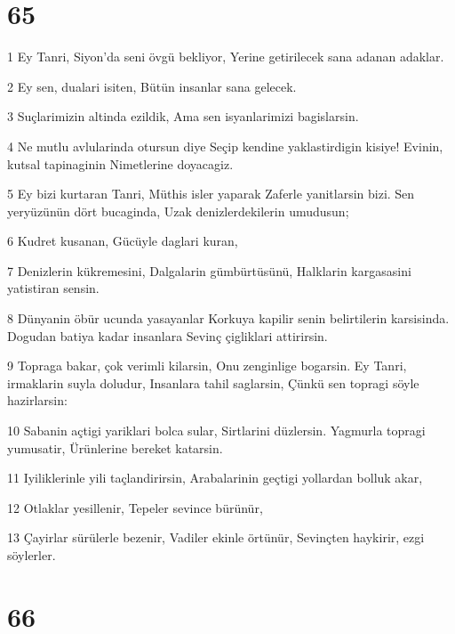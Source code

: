 \chapter{65}

\par 1 Ey Tanri, Siyon'da seni övgü bekliyor, Yerine getirilecek sana adanan adaklar.
\par 2 Ey sen, dualari isiten, Bütün insanlar sana gelecek.
\par 3 Suçlarimizin altinda ezildik, Ama sen isyanlarimizi bagislarsin.
\par 4 Ne mutlu avlularinda otursun diye Seçip kendine yaklastirdigin kisiye! Evinin, kutsal tapinaginin Nimetlerine doyacagiz.
\par 5 Ey bizi kurtaran Tanri, Müthis isler yaparak Zaferle yanitlarsin bizi. Sen yeryüzünün dört bucaginda, Uzak denizlerdekilerin umudusun;
\par 6 Kudret kusanan, Gücüyle daglari kuran,
\par 7 Denizlerin kükremesini, Dalgalarin gümbürtüsünü, Halklarin kargasasini yatistiran sensin.
\par 8 Dünyanin öbür ucunda yasayanlar Korkuya kapilir senin belirtilerin karsisinda. Dogudan batiya kadar insanlara Sevinç çigliklari attirirsin.
\par 9 Topraga bakar, çok verimli kilarsin, Onu zenginlige bogarsin. Ey Tanri, irmaklarin suyla doludur, Insanlara tahil saglarsin, Çünkü sen topragi söyle hazirlarsin:
\par 10 Sabanin açtigi yariklari bolca sular, Sirtlarini düzlersin. Yagmurla topragi yumusatir, Ürünlerine bereket katarsin.
\par 11 Iyiliklerinle yili taçlandirirsin, Arabalarinin geçtigi yollardan bolluk akar,
\par 12 Otlaklar yesillenir, Tepeler sevince bürünür,
\par 13 Çayirlar sürülerle bezenir, Vadiler ekinle örtünür, Sevinçten haykirir, ezgi söylerler.

\chapter{66}

